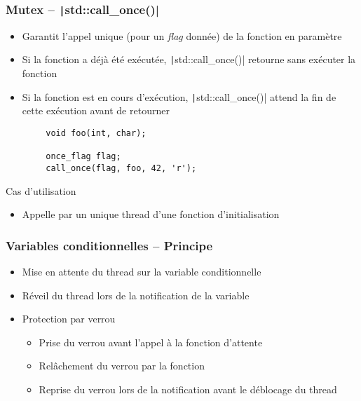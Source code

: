 \documentclass[C++.tex]{subfiles}
\begin{document}
\begin{frame}[fragile]
	\frametitle{Mutex -- \texttt|std::call_once()|}
	\begin{itemize}
		\item Garantit l'appel unique (pour un \textit{flag} donnée) de la fonction en paramètre
		\item Si la fonction a déjà été exécutée, \texttt|std::call_once()| retourne sans exécuter la fonction
		\item Si la fonction est en cours d'exécution, \texttt|std::call_once()| attend la fin de cette exécution avant de retourner
	\end{itemize}

	\begin{verbatim}
		void foo(int, char);

		once_flag flag;
		call_once(flag, foo, 42, 'r');
	\end{verbatim}

	\begin{block}{Cas d'utilisation}
		\begin{itemize}
			\item Appelle par un unique thread d'une fonction d'initialisation
		\end{itemize}
	\end{block}
\end{frame}

\begin{frame}[fragile]
	\frametitle{Variables conditionnelles -- Principe}
	\begin{itemize}
		\item Mise en attente du thread sur la variable conditionnelle
		\item Réveil du thread lors de la notification de la variable
		\item Protection par verrou
		\begin{itemize}
			\item Prise du verrou avant l'appel à la fonction d'attente
			\item Relâchement du verrou par la fonction
			\item Reprise du verrou lors de la notification avant le déblocage du thread
		\end{itemize}
	\end{itemize}
\end{frame}
\end{document}
